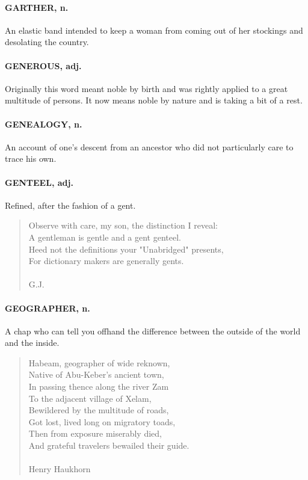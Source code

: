 \documentclass[11pt]{article}
\begin{document}
\paragraph{GARTHER, n.}  An elastic band intended to keep a woman from coming out
of her stockings and desolating the country.

\paragraph{GENEROUS, adj.}  Originally this word meant noble by birth and was
rightly applied to a great multitude of persons.  It now means noble
by nature and is taking a bit of a rest.

\paragraph{GENEALOGY, n.}  An account of one's descent from an ancestor who did
not particularly care to trace his own.

\paragraph{GENTEEL, adj.}  Refined, after the fashion of a gent.

\begin{quote}   Observe with care, my son, the distinction I reveal: \\
  A gentleman is gentle and a gent genteel. \\
  Heed not the definitions your "Unabridged" presents, \\
  For dictionary makers are generally gents. \\
 \\
G.J. \end{quote}


\paragraph{GEOGRAPHER, n.}  A chap who can tell you offhand the difference between
the outside of the world and the inside.

\begin{quote}   Habeam, geographer of wide reknown, \\
  Native of Abu-Keber's ancient town, \\
  In passing thence along the river Zam \\
  To the adjacent village of Xelam, \\
  Bewildered by the multitude of roads, \\
  Got lost, lived long on migratory toads, \\
  Then from exposure miserably died, \\
  And grateful travelers bewailed their guide. \\
 \\
Henry Haukhorn \end{quote}
\end{document}
